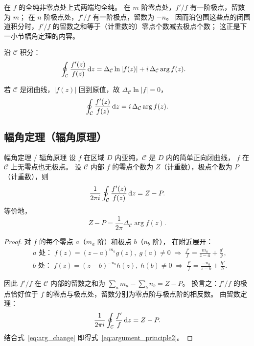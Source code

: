 在 $f$ 的全纯非零点处上式两端均全纯。
在 $m$ 阶零点处，$f'/f$ 有一阶极点，留数为 $m$；
在 $n$ 阶极点处，$f'/f$ 有一阶极点，留数为 $-n$。
因而沿包围这些点的闭围道积分时，$f'/f$ 的留数之和等于（计重数的）零点个数减去极点个数；
这正是下一小节幅角定理的内容。

沿 $\mathcal{C}$ 积分：
\begin{align}
  \oint_{\mathcal{C}}\frac{f'(z)}{f(z)}\,\mathrm{d} z
  &= \Delta_{\mathcal{C}}\ln|f(z)| + i\,\Delta_{\mathcal{C}}\arg f(z).
  \label{eq:log_deriv_int}
\end{align}

若 $\mathcal{C}$ 是闭曲线，$|f(z)|$ 回到原值，故 $\Delta_{\mathcal{C}}\ln|f|=0$，
\begin{equation}
  \oint_{\mathcal{C}}\frac{f'(z)}{f(z)}\,\mathrm{d} z = i\,\Delta_{\mathcal{C}}\arg f(z).
  \label{eq:arg_change}
\end{equation}

\subsection{幅角定理（辐角原理）}

\begin{theorem}{幅角定理 / 辐角原理}{}
\label{thm:argument_principle}
设 $f$ 在区域 $D$ 内亚纯，$\mathcal{C}$ 是 $D$ 内的简单正向闭曲线，
$f$ 在 $\mathcal{C}$ 上无零点也无极点。
设 $\mathcal{C}$ 内部 $f$ 的零点个数为 $Z$（计重数），极点个数为 $P$（计重数），则
\begin{equation}
    \frac{1}{2\pi i}\oint_{\mathcal{C}}\frac{f'(z)}{f(z)}\,\mathrm{d} z = Z - P.
  \label{eq:argument_principle}
\end{equation}
等价地，
\begin{equation}
  Z - P = \frac{1}{2\pi}\Delta_{\mathcal{C}}\arg f(z).
  \label{eq:argument_principle2}
\end{equation}
\end{theorem}

\begin{proof}
对 $f$ 的每个零点 $a$（$m_a$ 阶）和极点 $b$（$n_b$ 阶），
在附近展开：
\begin{align}
  &a\text{ 处：}\; f(z)=(z-a)^{m_a}g(z),\;g(a)\ne0
  \;\Rightarrow\; \frac{f'}{f}=\frac{m_a}{z-a}+\frac{g'}{g},\\
  &b\text{ 处：}\; f(z)=(z-b)^{-n_b}h(z),\;h(b)\ne0
  \;\Rightarrow\; \frac{f'}{f}=\frac{-n_b}{z-b}+\frac{h'}{h}.
\end{align}

因此 $f'/f$ 在 $\mathcal{C}$ 内部的留数之和为
$\sum_a m_a - \sum_b n_b = Z-P$。
换言之：$f'/f$ 的极点恰好位于 $f$ 的零点与极点处，留数分别为零点阶与极点阶的相反数。
由留数定理：
\[
  \frac{1}{2\pi i}\oint_{\mathcal{C}}\frac{f'}{f}\,\mathrm{d} z = Z-P.
\]
结合式~\eqref{eq:arg_change} 即得式~\eqref{eq:argument_principle2}。
\end{proof}

